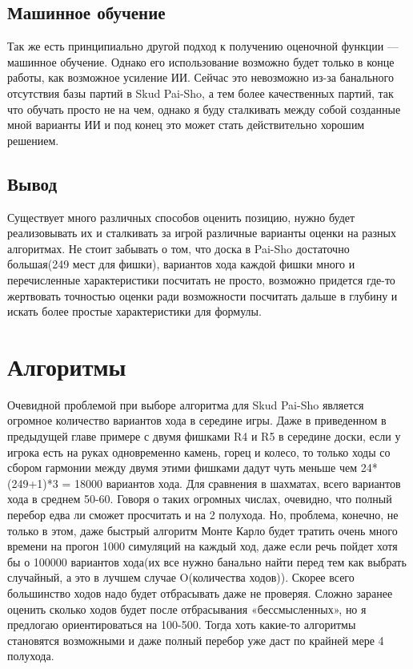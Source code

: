 \documentclass[a4paper,12pt]{diplom}
\begin{document}
\section{Машинное обучение}
Так же есть принципиально другой подход к получению оценочной функции — машинное обучение. Однако его использование возможно будет только в конце работы, как возможное усиление ИИ. Сейчас это невозможно из-за банального отсутствия базы партий в Skud Pai-Sho, а тем более качественных партий, так что обучать просто не на чем, однако я буду сталкивать между собой созданные мной варианты ИИ и под конец это может стать действительно хорошим решением.

\section{Вывод}
Существует много различных способов оценить позицию, нужно будет реализовывать их и сталкивать за игрой различные варианты оценки на разных алгоритмах. Не стоит забывать о том, что доска в Pai-Sho достаточно большая(249 мест для фишки), вариантов хода каждой фишки много и перечисленные характеристики посчитать не просто, возможно придется где-то жертвовать точностью оценки ради возможности посчитать дальше в глубину и искать более простые характеристики для формулы.

\chapter{Алгоритмы}

Очевидной проблемой при выборе алгоритма для Skud Pai-Sho является огромное количество вариантов хода в середине игры. Даже в приведенном в предыдущей главе примере с двумя фишками R4 и R5 в середине доски, если у игрока есть на руках одновременно камень, горец и колесо, то только ходы со сбором гармонии между двумя этими фишками дадут чуть меньше чем 24*(249+1)*3 = 18000 вариантов хода. Для сравнения в шахматах, всего вариантов хода в среднем 50-60. Говоря о таких огромных числах, очевидно, что полный перебор едва ли сможет просчитать и на 2 полухода. Но, проблема, конечно, не только в этом, даже быстрый алгоритм Монте Карло будет тратить очень много времени на прогон 1000 симуляций на каждый ход, даже если речь пойдет хотя бы о 100000 вариантов хода(их все нужно банально найти перед тем как выбрать случайный, а это в лучшем случае O(количества ходов)). Скорее всего большинство ходов надо будет отбрасывать даже не проверяя. Сложно заранее оценить сколько ходов будет после отбрасывания «бессмысленных», но я предлогаю ориентироваться на 100-500. Тогда хоть какие-то алгоритмы становятся возможными и даже полный перебор уже даст по крайней мере 4 полухода.
\end{document}
